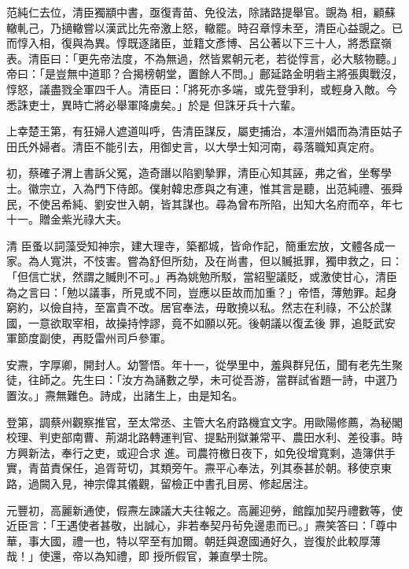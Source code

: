\begin{pinyinscope}
 范純仁去位，清臣獨顓中書，亟復青苗、免役法，除諸路提舉官。覬為
 相，顧蘇轍軋己，乃擿轍嘗以漢武比先帝激上怒，轍罷。時召章惇未至，清臣心益覬之。已而惇入相，復與為異。惇既逐諸臣，並籍文彥博、呂公著以下三十人，將悉竄嶺表。清臣曰：「更先帝法度，不為無過，然皆累朝元老，若從惇言，必大駭物聽。」帝曰：「是豈無中道耶？合揭榜朝堂，置餘人不問。」鄜延路金明砦主將張輿戰沒，惇怒，議盡戮全軍四千人。清臣曰：「將死亦多端，或先登爭利，或輕身入敵。今悉誅吏士，異時亡將必舉軍降虜矣。」於是
 但誅牙兵十六輩。



 上幸楚王第，有狂婦人遮道叫呼，告清臣謀反，屬吏捕治，本澶州娼而為清臣姑子田氏外婦者。清臣不能引去，用御史言，以大學士知河南，尋落職知真定府。



 初，蔡確子渭上書訴父冤，造奇譖以陷劉摯罪，清臣心知其誣，弗之省，坐奪學士。徽宗立，入為門下侍郎。僕射韓忠彥與之有連，惟其言是聽，出范純禮、張舜民，不使呂希純、劉安世入朝，皆其謀也。尋為曾布所陷，出知大名府而卒，年七十一。贈金紫光祿大夫。



 清
 臣蚤以詞藻受知神宗，建大理寺，築都城，皆命作記，簡重宏放，文體各成一家。為人寬洪，不忮害。嘗為舒但所劾，及在尚書，但以贓抵罪，獨申救之，曰：「但信亡狀，然謂之贓則不可。」再為姚勉所駁，當紹聖議貶，或激使甘心，清臣為之言曰：「勉以議事，所見或不同，豈應以臣故而加重？」帝悟，薄勉罪。起身窮約，以儉自持，至富貴不改。居官奉法，毋敢撓以私。然志在利祿，不公於謀國，一意欲取宰相，故操持悖謬，竟不如願以死。後朝議以復孟後
 罪，追貶武安軍節度副使，再貶雷州司戶參軍。



 安燾，字厚卿，開封人。幼警悟。年十一，從學里中，羞與群兒伍，聞有老先生聚徒，往師之。先生曰：「汝方為誦數之學，未可從吾游，當群試省題一詩，中選乃置汝。」燾無難色。詩成，出諸生上，由是知名。



 登第，調蔡州觀察推官，至太常丞、主管大名府路機宜文字。用歐陽修薦，為秘閣校理、判吏部南曹、荊湖北路轉運判官、提點刑獄兼常平、農田水利、差役事。時方興新法，奉行之吏，或迎合求
 進。司農符檄日夜下，如免役增寬剩，造簿供手實，青苗責保任，追胥苛切，其類旁午。燾平心奉法，列其泰甚於朝。移使京東路，過闕入見，神宗偉其儀觀，留檢正中書孔目房、修起居注。



 元豐初，高麗新通使，假燾左諫議大夫往報之。高麗迎勞，館餼加契丹禮數等，使近臣言：「王遇使者甚敬，出誠心，非若奉契丹茍免邊患而已。」燾笑答曰：「尊中華，事大國，禮一也，特以罕至有加爾。朝廷與遼國通好久，豈復於此較厚薄哉！」使還，帝以為知禮，即
 授所假官，兼直學士院。




\end{pinyinscope}
